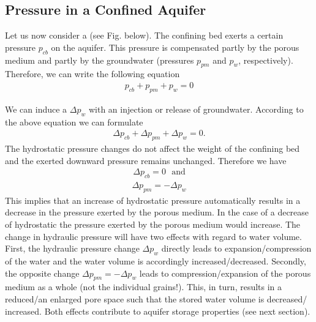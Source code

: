 \documentclass[letterpaper,10pt,english]{sphinxmanual}
\let\sphinxpxdimen\pdfpxdimen\else\newdimen\sphinxpxdimen
\begin{document}
\noindent{\hspace*{\fill}\sphinxincludegraphics[width=400\sphinxpxdimen]{{L03_f_12}.png}\hspace*{\fill}}


\subsection{Pressure in a Confined Aquifer}
\label{\detokenize{contents/flow/lecture_03/13_gw_storage:pressure-in-a-confined-aquifer}}
Let us now consider a  (see Fig. below). The confining bed exerts a certain pressure \(p_{cb}\) on the aquifer. This pressure is compensated partly by the porous medium and partly by the groundwater (pressures \(p_{pm}\) and \(p_w\), respectively). Therefore, we can write the following equation
\begin{equation*}
\begin{split}
p_{cb} + p_{pm} + p_w = 0
\end{split}
\end{equation*}
\noindent{\hspace*{\fill}\sphinxincludegraphics[width=400\sphinxpxdimen]{{L03_f_13}.png}\hspace*{\fill}}

We can induce a  \(\Delta p_w\) with an injection or release of groundwater. According to the above equation we can formulate
\begin{equation*}
\begin{split}
\Delta p_{cb} + \Delta p_{pm} + \Delta p_w = 0.
\end{split}
\end{equation*}
The hydrostatic pressure changes do not affect the weight of the confining bed and the exerted downward pressure remains unchanged. Therefore we have
\begin{equation*}
\begin{split}
\Delta p_{cb} = 0 \:\:\: \text{and}
\end{split}
\end{equation*}\begin{equation*}
\begin{split}
\Delta p_{pm} = -\Delta p_w
\end{split}
\end{equation*}
This implies that an increase of hydrostatic pressure automatically results in a decrease in the pressure exerted by the porous medium. In the case of a decrease of hydrostatic the pressure exerted by the porous medium would increase.
The change in hydraulic pressure will have two effects with regard to water volume. First, the hydraulic pressure change \(\Delta p_w\) directly leads to expansion/compression of the water and the water volume is accordingly increased/decreased. Secondly, the opposite change \(\Delta p_{pm} = -\Delta p_w\) leads to compression/expansion of the porous medium as a whole (not the individual grains!). This, in turn, results in a reduced/an enlarged pore space such that the stored water volume is decreased/ increased. Both effects contribute to aquifer storage properties (see next section).
\end{document}
